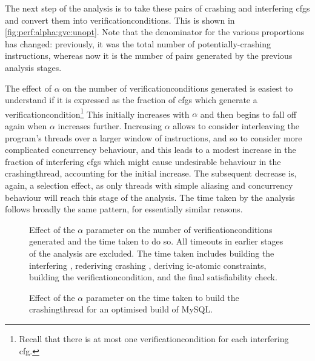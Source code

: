 The next step of the analysis is to take these pairs of crashing
{\StateMachines} and interfering \glspl{cfg} and convert them into
\glspl{verificationcondition}.  This is shown in
\autoref{fig:perf:alpha:gvc:unopt}.  Note that the denominator for
the various proportions has changed: previously, it was the total
number of potentially-crashing instructions, whereas now it is the
number of pairs generated by the previous analysis stages.

The effect of $\alpha$ on the number of \glspl{verificationcondition}
generated is easiest to understand if it is expressed as the fraction
of \glspl{cfg} which generate a
\gls{verificationcondition}\footnote{Recall that there is at most one
  \gls{verificationcondition} for each interfering \gls{cfg}.}  This
initially increases with $\alpha$ and then begins to fall off again
when $\alpha$ increases further.  Increasing $\alpha$ allows
{\technique} to consider interleaving the program's threads over a
larger window of instructions, and so to consider more complicated
concurrency behaviour, and this leads to a modest increase in the
fraction of interfering \glspl{cfg} which might cause undesirable
behaviour in the \gls{crashingthread}, accounting for the initial
increase.  The subsequent decrease is, again, a selection effect, as
only threads with simple aliasing and concurrency behaviour will reach
this stage of the analysis.  The time taken by the analysis follows
broadly the same pattern, for essentially similar reasons.

\begin{figure}
  \centerline{}
  \caption{Effect of the $\alpha$ parameter on the number of
    \glspl{verificationcondition} generated and the time taken to do
    so.  All timeouts in earlier stages of the analysis are excluded.
    The time taken includes building the interfering {\StateMachine},
    rederiving crashing {\StateMachine}, deriving \gls{ic-atomic}
    constraints, building the \gls{verificationcondition}, and the
    final satisfiability check.}
  \label{fig:perf:alpha:gvc:unopt}
\end{figure}

\begin{figure}
  \caption{Effect of the $\alpha$ parameter on the time taken to build
    the \gls{crashingthread} {\StateMachines} for an optimised build
    of MySQL.}
  \label{fig:perf:alpha:bpm:opt}
\end{figure}

